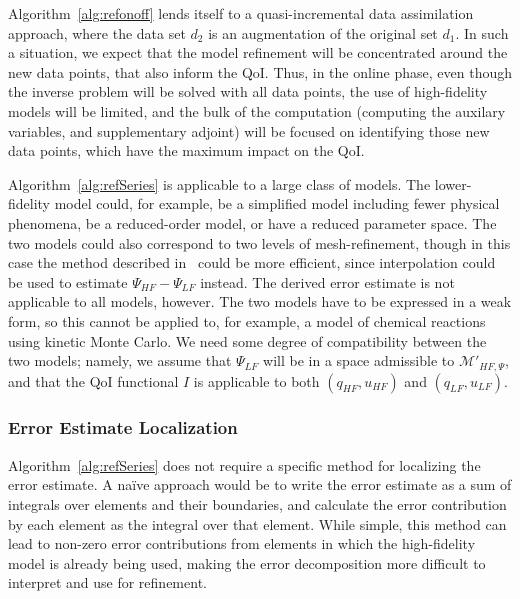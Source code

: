 %
Algorithm~\cref{alg:refonoff} lends itself to a quasi-incremental data assimilation approach, where the data set $d_2$ is an augmentation of the original set $d_1$. In such a situation, we expect that the model refinement will be concentrated around the new data points, that also inform the QoI. Thus, in the online phase, even though the inverse problem will be solved with all data points, the use of high-fidelity models will be limited, and the bulk of the computation (computing the auxilary variables, and supplementary adjoint) will be focused on identifying those new data points, which have the maximum impact on the QoI.

Algorithm~\cref{alg:refSeries} is applicable to a large class of models. The lower-fidelity model could, for example, be a simplified model including fewer physical phenomena, be a reduced-order model, or have a reduced parameter space. The two models could also correspond to two levels of mesh-refinement, though in this case the method described in~\cite{BecVex05} could be more efficient, since interpolation could be used to estimate $\Psi_{HF}-\Psi_{LF}$ instead. The derived error estimate is not applicable to all models, however. The two models have to be expressed in a weak form, so this cannot be applied to, for example, a model of chemical reactions using kinetic Monte Carlo. We need some degree of compatibility between the two models; namely, we assume that $\Psi_{LF}$ will be in a space admissible to $\mathcal{M}'_{HF,\Psi}$, and that the QoI functional $I$ is applicable to both $(q_{HF},u_{HF})$ and $(q_{LF},u_{LF})$.
\subsubsection{Error Estimate Localization}\label{sec:errLocal}
Algorithm~\cref{alg:refSeries} does not require a specific method for localizing the error estimate. A na\"{i}ve approach would be to write the error estimate as a sum of integrals over elements and their boundaries, and calculate the error contribution by each element as the integral over that element. While simple, this method can lead to non-zero error contributions from elements in which the high-fidelity model is already being used, making the error decomposition more difficult to interpret and use for refinement.

